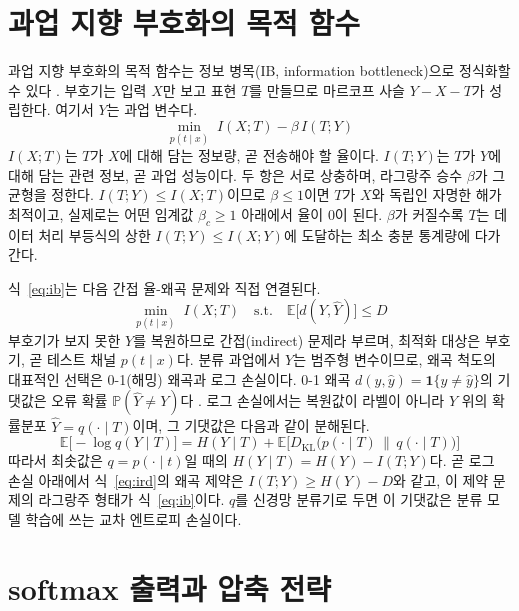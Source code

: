 \documentclass[11pt,a4paper]{article}
\newcommand{\E}{\mathbb{E}}
\renewcommand{\P}{\mathbb{P}}
\newcommand{\I}{I}
\newcommand{\Yh}{\hat{Y}}
\newcommand{\KL}{D_{\mathrm{KL}}}
\begin{document}
\section{과업 지향 부호화의 목적 함수}

과업 지향 부호화의 목적 함수는 정보 병목(IB, information bottleneck)으로 정식화할 수 있다 \cite{tishby1999}. 부호기는 입력 $X$만 보고 표현 $T$를 만들므로 마르코프 사슬 $Y - X - T$가 성립한다. 여기서 $Y$는 과업 변수다.
\begin{equation}
\min_{p(t\mid x)}\; \I(X;T) - \beta\, \I(T;Y)
\label{eq:ib}
\end{equation}
$\I(X;T)$는 $T$가 $X$에 대해 담는 정보량, 곧 전송해야 할 율이다. $\I(T;Y)$는 $T$가 $Y$에 대해 담는 관련 정보, 곧 과업 성능이다. 두 항은 서로 상충하며, 라그랑주 승수 $\beta$가 그 균형을 정한다. $\I(T;Y)\le \I(X;T)$이므로 $\beta\le1$이면 $T$가 $X$와 독립인 자명한 해가 최적이고, 실제로는 어떤 임계값 $\beta_c\ge1$ 아래에서 율이 0이 된다. $\beta$가 커질수록 $T$는 데이터 처리 부등식의 상한 $\I(T;Y)\le \I(X;Y)$에 도달하는 최소 충분 통계량에 다가간다.

식~\eqref{eq:ib}는 다음 간접 율-왜곡 문제와 직접 연결된다.
\begin{equation}
\min_{p(t\mid x)}\; \I(X;T) \quad \text{s.t.} \quad \E\bigl[d(Y,\Yh)\bigr] \le D
\label{eq:ird}
\end{equation}
부호기가 보지 못한 $Y$를 복원하므로 간접(indirect) 문제라 부르며, 최적화 대상은 부호기, 곧 테스트 채널 $p(t\mid x)$다. 분류 과업에서 $Y$는 범주형 변수이므로, 왜곡 척도의 대표적인 선택은 0-1(해밍) 왜곡과 로그 손실이다. 0-1 왜곡 $d(y,\hat y)=\mathbf{1}\{y\ne\hat y\}$의 기댓값은 오류 확률 $\P(\Yh\ne Y)$다 \cite{enttsel2026}. 로그 손실에서는 복원값이 라벨이 아니라 $Y$ 위의 확률분포 $\Yh=q(\cdot\mid T)$이며, 그 기댓값은 다음과 같이 분해된다.
\begin{equation}
\E\bigl[-\log q(Y\mid T)\bigr] = H(Y\mid T) + \E\bigl[\KL\bigl(p(\cdot\mid T)\,\big\|\,q(\cdot\mid T)\bigr)\bigr]
\end{equation}
따라서 최솟값은 $q=p(\cdot\mid t)$일 때의 $H(Y\mid T)=H(Y)-\I(T;Y)$다. 곧 로그 손실 아래에서 식~\eqref{eq:ird}의 왜곡 제약은 $\I(T;Y)\ge H(Y)-D$와 같고, 이 제약 문제의 라그랑주 형태가 식~\eqref{eq:ib}이다. $q$를 신경망 분류기로 두면 이 기댓값은 분류 모델 학습에 쓰는 교차 엔트로피 손실이다.

\section{softmax 출력과 압축 전략}
\end{document}
